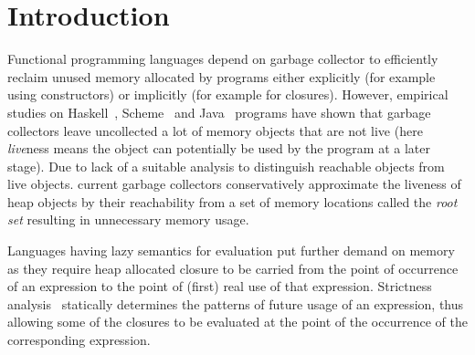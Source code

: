 \documentclass[9pt]{sigplanconf}
\begin{document}
\section{Introduction}
\label{sec:intro}

Functional  programming  languages  depend  on  garbage  collector  to
efficiently  reclaim  unused  memory   allocated  by  programs  either
explicitly (for example using constructors) or implicitly (for example
for      closures).       However,      empirical      studies      on
Haskell~\cite{rojemo96lag},  Scheme~\cite{karkare06effectiveness}  and
Java~\cite{shaham02estimating}  programs   have  shown   that  garbage
collectors leave uncollected a lot of memory objects that are not live
(here {\em live}ness  means the object can potentially be  used by the
program at  a later  stage).  Due  to lack of  a suitable  analysis to
distinguish  reachable  objects  from live  objects.  current  garbage
collectors conservatively approximate the  liveness of heap objects by
their reachability from a set of memory locations called the {\em root
  set\/} resulting in unnecessary memory usage.

Languages having lazy  semantics for evaluation put  further demand on
memory as they  require heap allocated closure to be  carried from the
point of occurrence  of an expression to the point  of (first) real use
of  that expression.  Strictness analysis~\cite{some-refs}  statically
determines  the  patterns  of  future usage  of  an  expression,  thus
allowing some  of the  closures to  be evaluated at  the point  of the
occurrence of the corresponding expression.
\newcommand{\nilfigure}
{\scalebox{0.75}{
\psset{unit=1mm,nodesep=0mm,labelsep=0.5mm}
\begin{pspicture}(0,0)(1,1)
\putnode{start}{origin}{0}{0}{}
\putnode{stop}{origin}{10}{10}{}
\ncline[offsetB=0,nodesepB=0,linewidth=.7]{-}{start}{stop} %
\end{pspicture}
}}
\end{document}
